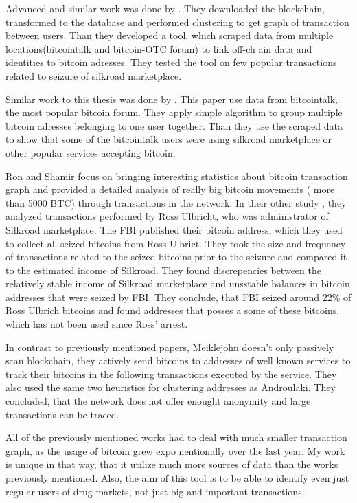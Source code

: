 \documentclass[
  digital, %
  table,   %
  lof,     %
  lot,     %
  oneside
]{fithesis3}
\begin{document}
Advanced and similar work was done by \parencite{spagnuolo2014bitiodine}. They downloaded the blockchain, transformed to
 the database
and performed clustering to get graph of transaction between users.
Than they developed a tool, which scraped data from multiple locations(bitcointalk and bitcoin-OTC forum) to link off-ch
ain data and identities to bitcoin adresses.
They tested the tool on few popular transactions related to seizure of silkroad marketplace.

Similar work to this thesis was done by \parencite{fleder2015bitcoin}.
This paper use data from bitcointalk, the most popular bitcoin forum. 
They apply simple algorithm to group multiple bitcoin adresses belonging to one user together.
Than they use the scraped data to show
that some of the bitcointalk users were using silkroad marketplace or other popular services accepting bitcoin.
 
Ron and Shamir \parencite{ron2013quantitative} focus on bringing
interesting statistics about bitcoin transaction graph
and provided a detailed analysis of really big bitcoin movements ( more than 5000 BTC) 
through transactions in the network.
In their other study \parencite{ron2014did}, they analyzed transactions performed by Ross Ulbricht,
who was administrator of Silkroad marketplace.
The FBI published their bitcoin address, which they used to collect all seized bitcoins from Ross Ulbrict.
They took the size and frequency of transactions related to the seized bitcoins prior to the seizure and compared 
it to the estimated income of Silkroad. They found discrepencies between the
relatively stable income of Silkroad marketplace and unsstable balances in bitcoin addresses
that were seized by FBI. They conclude, that FBI seized around 22\% of Ross Ulbrich bitcoins
and found addresses that posses a some of these bitcoins, which has not been used since Ross' arrest.

In contrast to previously mentioned papers, Meiklejohn \parencite{meiklejohn2013fistful} 
doesn't only passively scan blockchain, they actively send bitcoins to addresses of
well known services to track their bitcoins in the following transactions executed by the service.
They also used the same two heuristics for clustering addresses
as Androulaki. \parencite{androulaki2013evaluating}
They concluded, that the network does not offer enought anonymity and large transactions can be traced.

All of the previously mentioned works had to deal with much smaller transaction graph, as the usage of bitcoin grew expo
nentionally over the last year. 
My work is unique in that way, that it utilize much more sources of data than the works previously mentioned. Also, the 
aim of this tool is to be able
to identify even just regular users of drug markets, not just big and important transactions.
\end{document}
